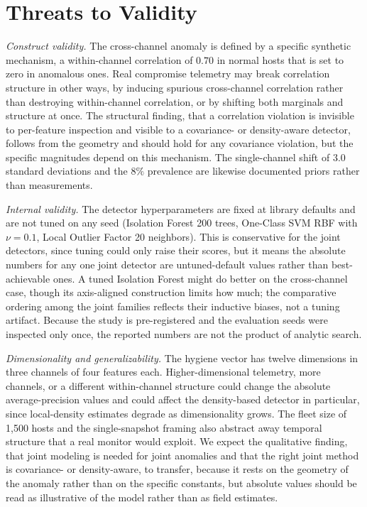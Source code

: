 \documentclass[journal]{IEEEtran}
\begin{document}
\section{Threats to Validity}
\emph{Construct validity.} The cross-channel anomaly is defined by a specific synthetic mechanism, a
within-channel correlation of $0.70$ in normal hosts that is set to zero in anomalous ones. Real
compromise telemetry may break correlation structure in other ways, by inducing spurious
cross-channel correlation rather than destroying within-channel correlation, or by shifting both
marginals and structure at once. The structural finding, that a correlation violation is invisible
to per-feature inspection and visible to a covariance- or density-aware detector, follows from the
geometry and should hold for any covariance violation, but the specific magnitudes depend on this
mechanism. The single-channel shift of $3.0$ standard deviations and the $8\%$ prevalence are
likewise documented priors rather than measurements.

\emph{Internal validity.} The detector hyperparameters are fixed at library defaults and are not
tuned on any seed (Isolation Forest 200 trees, One-Class SVM RBF with $\nu = 0.1$, Local Outlier
Factor 20 neighbors). This is conservative for the joint detectors, since tuning could only raise
their scores, but it means the absolute numbers for any one joint detector are untuned-default
values rather than best-achievable ones. A tuned Isolation Forest might do better on the
cross-channel case, though its axis-aligned construction limits how much; the comparative ordering
among the joint families reflects their inductive biases, not a tuning artifact. Because the study
is pre-registered and the evaluation seeds were inspected only once, the reported numbers are not the
product of analytic search.

\emph{Dimensionality and generalizability.} The hygiene vector has twelve dimensions in three
channels of four features each. Higher-dimensional telemetry, more channels, or a different
within-channel structure could change the absolute average-precision values and could affect the
density-based detector in particular, since local-density estimates degrade as dimensionality grows.
The fleet size of 1{,}500 hosts and the single-snapshot framing also abstract away temporal
structure that a real monitor would exploit. We expect the qualitative finding, that joint modeling
is needed for joint anomalies and that the right joint method is covariance- or density-aware, to
transfer, because it rests on the geometry of the anomaly rather than on the specific constants, but
absolute values should be read as illustrative of the model rather than as field estimates.
\end{document}
